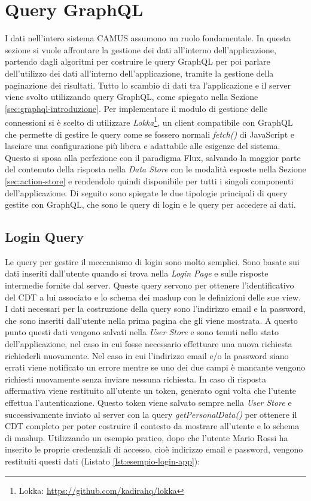 \section{Query GraphQL}\label{sec:utilizzo-dati-app}

I dati nell'intero sistema CAMUS assumono un ruolo fondamentale. In questa sezione si vuole affrontare la gestione dei dati all'interno dell'applicazione, partendo dagli algoritmi per costruire le query GraphQL per poi parlare dell'utilizzo dei dati all'interno dell'applicazione, tramite la gestione della paginazione dei risultati.
Tutto lo scambio di dati tra l'applicazione e il server viene svolto utilizzando query GraphQL, come spiegato nella Sezione \ref{sec:graphql-introduzione}. Per implementare il modulo di gestione delle connessioni si è scelto di utilizzare \emph{Lokka}\footnote{Lokka: \url{https://github.com/kadirahq/lokka}}, un client compatibile con GraphQL che permette di gestire le query come se fossero normali \emph{fetch()} di JavaScript e lasciare una configurazione più libera e adattabile alle esigenze del sistema. Questo si sposa alla perfezione con il paradigma Flux, salvando la maggior parte del contenuto della risposta nella \emph{Data Store} con le modalità esposte nella Sezione \ref{sec:action-store} e rendendolo quindi disponibile per tutti i singoli componenti dell'applicazione. Di seguito sono spiegate le due tipologie principali di query gestite con GraphQL, che sono le query di login e le query per accedere ai dati.

\subsection{Login Query}

Le query per gestire il meccanismo di login sono molto semplici. Sono basate sui dati inseriti dall'utente quando si trova nella \emph{Login Page} e sulle risposte intermedie fornite dal server. Queste query servono per ottenere l'identificativo del CDT a lui associato e lo schema dei mashup con le definizioni delle sue view.
I dati necessari per la costruzione della query sono l'indirizzo email e la password, che sono inseriti dall'utente nella prima pagina che gli viene mostrata. A questo punto questi dati vengono salvati nella \emph{User Store} e sono tenuti nello stato dell'applicazione, nel caso in cui fosse necessario effettuare una nuova richiesta richiederli nuovamente. Nel caso in cui l'indirizzo email e/o la password siano errati viene notificato un errore mentre se uno dei due campi è mancante vengono richiesti nuovamente senza inviare nessuna richiesta.
In caso di risposta affermativa viene restituito all'utente un token, generato ogni volta che l'utente effettua l'autenticazione. Questo token viene salvato sempre nella \emph{User Store} e successivamente inviato al server con la query \emph{getPersonalData()} per ottenere il CDT completo per poter costruire il contesto da mostrare all'utente e lo schema di mashup.
Utilizzando un esempio pratico, dopo che l'utente Mario Rossi ha inserito le proprie credenziali di accesso, cioè indirizzo email e password, vengono restituiti questi dati (Listato \ref{lst:esempio-login-app}): 

